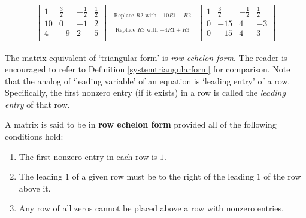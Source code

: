 \documentclass{ximera}
\begin{document}
\[\begin{array}{ccc}

\left[ \begin{array}{rrr|r} 
1 & \frac{3}{2} & -\frac{1}{2} & \frac{1}{2}  \\
10 & 0 & -1 & 2 \\ 
4 & -9 & 2 & 5 \\ 

\end{array} \right]

&
\xrightarrow[\text{Replace $R3$ with $-4R1 + R3$}]{\text{Replace $R2$ with $-10R1 + R2$}}
&

\left[ \begin{array}{rrr|r} 
1 & \frac{3}{2} & -\frac{1}{2} & \frac{1}{2}  \\
0 & -15 & 4 & -3 \\ 
0 & -15 & 4 & 3 \\ 

\end{array} \right]

\end{array}\]

The matrix equivalent of `triangular form' is   \textit{row echelon form}.  The reader is encouraged to refer to Definition \ref{systemtriangularform} for comparison.  Note that the analog of `leading variable' of an equation is `leading entry' of a row.  Specifically, the first nonzero entry (if it exists) in a row is called the   \textit{leading entry} of that row.
 
\smallskip


\begin{definition} \label{rowechelonform} A matrix is said to be in \textbf{row echelon form} provided all of the following conditions hold:

\begin{enumerate}

\item  The first nonzero entry in each row is $1$.

\item  The leading $1$ of a given row must be to the right of the leading $1$ of the row above it.

\item  Any row of all zeros cannot be placed above a row with nonzero entries.

\end{enumerate}



\end{definition}
\end{document}
